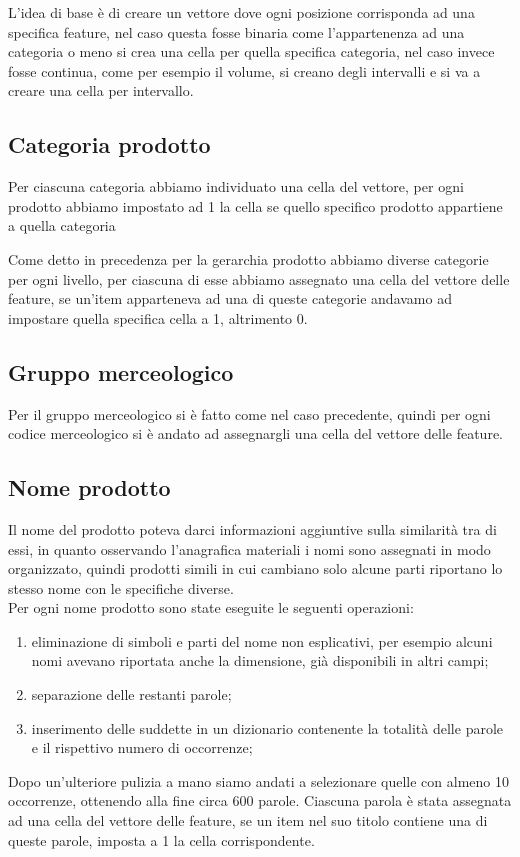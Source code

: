 L'idea di base è di creare un vettore dove ogni posizione corrisponda ad una specifica feature, nel caso questa fosse binaria come l'appartenenza ad una categoria o meno si crea una cella per quella specifica categoria, nel caso invece fosse continua, come per esempio il volume, si creano degli intervalli e si va a creare una cella per intervallo.
\subsection{Categoria prodotto}
Per ciascuna categoria  abbiamo individuato una cella del vettore, per ogni prodotto abbiamo impostato ad 1 la cella se quello specifico prodotto appartiene a quella categoria 

Come detto in precedenza per la gerarchia prodotto abbiamo diverse categorie per ogni livello, per ciascuna di esse abbiamo assegnato una cella del vettore delle feature, se un'item apparteneva ad una di queste categorie andavamo ad impostare quella specifica cella a 1, altrimento 0.

\subsection{Gruppo merceologico}
Per il gruppo merceologico si è fatto come nel caso precedente, quindi per ogni codice merceologico si è andato ad assegnargli una cella del vettore delle feature.

\subsection{Nome prodotto}
Il nome del prodotto poteva darci informazioni aggiuntive sulla similarità tra di essi, in quanto osservando l'anagrafica materiali i nomi sono assegnati in modo organizzato, quindi prodotti simili in cui cambiano solo alcune parti riportano lo stesso nome con le specifiche diverse.\\
Per ogni nome prodotto sono state eseguite le seguenti operazioni:
\begin{enumerate}
    \item eliminazione di simboli e parti del nome non esplicativi, per esempio alcuni nomi avevano riportata anche la dimensione, già disponibili in altri campi;
    \item separazione delle restanti parole;
    \item inserimento delle suddette in un dizionario contenente la totalità delle parole e il rispettivo numero di occorrenze;
\end{enumerate}
Dopo un'ulteriore pulizia a mano siamo andati a selezionare quelle con almeno 10 occorrenze, ottenendo alla fine circa 600 parole. Ciascuna parola è stata assegnata ad una cella del vettore delle feature, se un item nel suo titolo contiene una di queste parole, imposta a 1 la cella corrispondente.

